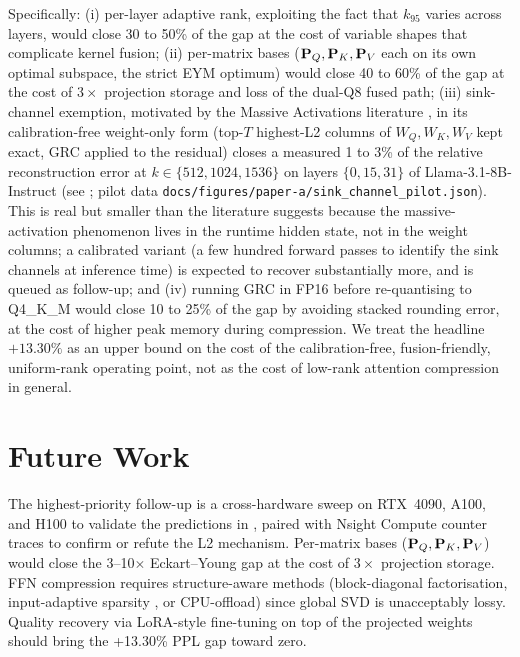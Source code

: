 \documentclass[11pt]{article}
\begin{document}
\begin{itemize}
Specifically: (i) per-layer adaptive rank, exploiting the fact that
$k_{95}$ varies across layers, would close 30 to 50\% of the gap at the
cost of variable shapes that complicate kernel fusion; (ii) per-matrix
bases ($\mathbf{P}_Q,\mathbf{P}_K,\mathbf{P}_V$ each on its own optimal subspace, the
strict EYM optimum) would close 40 to 60\% of the gap at the cost of
$3\times$ projection storage and loss of the dual-Q8 fused path; (iii)
sink-channel exemption, motivated by the Massive Activations literature
\cite{sun2024massive}, in its calibration-free weight-only form
(top-$T$ highest-L2 columns of $W_Q,W_K,W_V$ kept exact, GRC applied to
the residual) closes a measured 1 to 3\% of the relative reconstruction
error at $k\in\{512,1024,1536\}$ on layers $\{0,15,31\}$ of
Llama-3.1-8B-Instruct (see ; pilot data
\texttt{docs/figures/paper-a/sink\_channel\_pilot.json}). This is real
but smaller than the literature suggests because the massive-activation
phenomenon lives in the runtime hidden state, not in the weight
columns; a calibrated variant (a few hundred forward passes to identify
the sink channels at inference time) is expected to recover
substantially more, and is queued as follow-up; and (iv) running GRC in
FP16 before re-quantising to Q4\_K\_M would close 10 to 25\% of the gap
by avoiding stacked rounding error, at the cost of higher peak memory
during compression. We treat the headline $+13.30\%$ as an upper bound
on the cost of the calibration-free, fusion-friendly, uniform-rank
operating point, not as the cost of low-rank attention compression in
general.
\end{itemize}

\section{Future Work}
\label{sec:future}
The highest-priority follow-up is a cross-hardware sweep on RTX~4090, A100,
and H100 to validate the predictions in , paired with
Nsight Compute counter traces to confirm or refute the L2 mechanism.
Per-matrix bases ($\mathbf{P}_Q,\mathbf{P}_K,\mathbf{P}_V$) would close the
3--10$\times$ Eckart--Young gap at the cost of $3\times$ projection storage.
FFN compression requires structure-aware methods (block-diagonal
factorisation, input-adaptive sparsity \cite{elhage2022superposition},
or CPU-offload) since global SVD is unacceptably lossy.  Quality recovery via
LoRA-style \cite{hu2021lora} fine-tuning on top of the projected weights
should bring the +13.30\% PPL gap toward zero.
\end{document}
